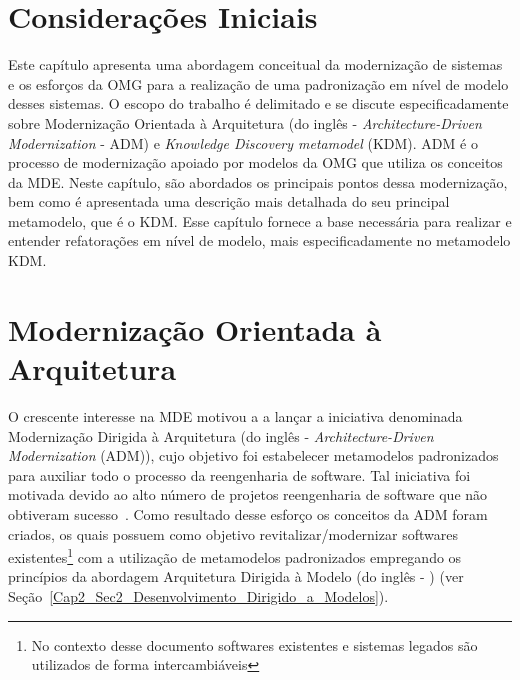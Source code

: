 
\section{Considerações Iniciais}

Este capítulo apresenta uma abordagem conceitual da modernização de sistemas e os esforços da OMG para a realização de uma padronização em nível de modelo desses sistemas. O escopo do trabalho é delimitado e se discute especificadamente sobre Modernização Orientada à Arquitetura (do inglês - \textit{Architecture-Driven Modernization} - ADM) e \textit{Knowledge Discovery metamodel} (KDM). ADM é o processo de modernização apoiado por modelos da OMG que utiliza os conceitos da MDE. Neste capítulo, são abordados os principais pontos dessa modernização, bem como é apresentada uma descrição mais detalhada do seu principal metamodelo, que é o KDM. Esse capítulo fornece a base necessária para realizar e entender refatorações em nível de modelo, mais especificadamente no metamodelo KDM.

\section{Modernização Orientada à Arquitetura}

O crescente interesse na MDE motivou a  a lançar a iniciativa denominada Modernização Dirigida à Arquitetura (do inglês - \textit{Architecture-Driven Modernization} (ADM)), cujo objetivo foi estabelecer metamodelos padronizados para auxiliar todo o  processo da reengenharia de software. Tal iniciativa foi motivada devido ao alto número de projetos reengenharia de software que não obtiveram sucesso~\cite{Sneed_2005, Demeyer2}. Como resultado desse esforço os conceitos da ADM foram criados, os quais possuem como objetivo revitalizar/modernizar softwares existentes\footnote{No contexto desse documento softwares existentes e sistemas legados são utilizados de forma intercambiáveis} com a utilização de metamodelos padronizados empregando os princípios da abordagem Arquitetura Dirigida à Modelo (do inglês - ) (ver Seção~\ref{Cap2_Sec2_Desenvolvimento_Dirigido_a_Modelos}). %


